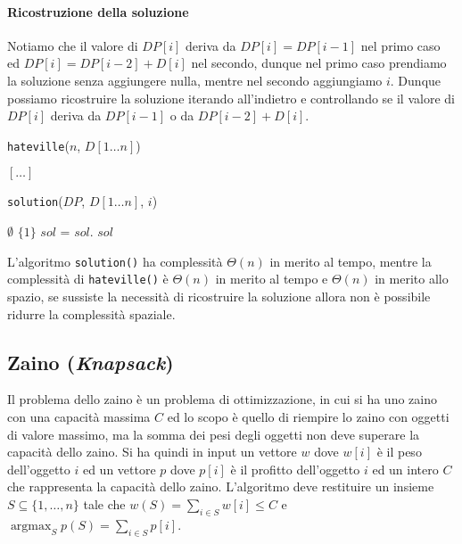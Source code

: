                 \paragraph{Ricostruzione della soluzione} Notiamo che il valore di $DP[i]$ deriva da $DP[i]=DP[i-1]$ nel primo caso ed $DP[i]=DP[i-2]+D[i]$ nel secondo, dunque nel primo caso prendiamo la soluzione senza aggiungere nulla, mentre nel secondo aggiungiamo $i$. Dunque possiamo ricostruire la soluzione iterando all'indietro e controllando se il valore di $DP[i]$ deriva da $DP[i-1]$ o da $DP[i-2]+D[i]$.
                \begin{algorithm}[H]
                    \caption{\Set \texttt{hateville}(\Int $n$, \Int $D[1 \ldots n]$)}
                    \begin{algorithmic}
                        \State $[\dots]$
                        \State \Return {}
                    \end{algorithmic}
                \end{algorithm}
                \begin{algorithm}[H]
                    \caption{\Set \texttt{solution}(\Int[] $DP$, \Int $D[1 \ldots n]$, \Int $i$)}
                    \begin{algorithmic}
                            \State \Return $\emptyset$
                            \State \Return $\{1\}$
                            \State \Return {}
                        \Else
                            \State \Set $sol$ = 
                            \State $sol$.
                            \State \Return $sol$
                        \EndIf
                    \end{algorithmic}
                \end{algorithm}
                L'algoritmo \texttt{solution()} ha complessità $\Theta(n)$ in merito al tempo, mentre la complessità di \texttt{hateville()} è $\Theta(n)$ in merito al tempo e $\Theta(n)$ in merito allo spazio, se sussiste la necessità di ricostruire la soluzione allora non è possibile ridurre la complessità spaziale.
        \subsection{Zaino (\textit{Knapsack})}
            Il problema dello zaino è un problema di ottimizzazione, in cui si ha uno zaino con una capacità massima $C$ ed lo scopo è quello di riempire lo zaino con oggetti di valore massimo, ma la somma dei pesi degli oggetti non deve superare la capacità dello zaino.\newline
            Si ha quindi in input un vettore $w$ dove $w[i]$ è il peso dell'oggetto $i$ ed un vettore $p$ dove $p[i]$ è il profitto dell'oggetto $i$ ed un intero $C$ che rappresenta la capacità dello zaino. L'algoritmo deve restituire un insieme $S\subseteq \{1,\ldots,n\}$ tale che $w(S)=\sum_{i\in S}w[i]\leq C$ e $\operatorname{argmax}_Sp(S)=\sum_{i\in S}p[i]$.

